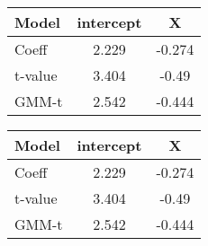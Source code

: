 \documentclass{beamer}
\begin{document}
\begin{frame}
\begin{table}
\begin{tabular}{l | c | c | }
Model & intercept & X \\
\hline \hline
Coeff & 2.229 & -0.274  \\ 
t-value & 3.404 & -0.49\\
GMM-t & 2.542 & -0.444 \\
\end{tabular}
\hfill
\begin{tabular}{l | c | c | }
Model & intercept & X \\
\hline \hline
Coeff & 2.229 & -0.274  \\ 
t-value & 3.404 & -0.49\\
GMM-t & 2.542 & -0.444 \\
\end{tabular}
\end{table}
\end{frame}
\end{document}
